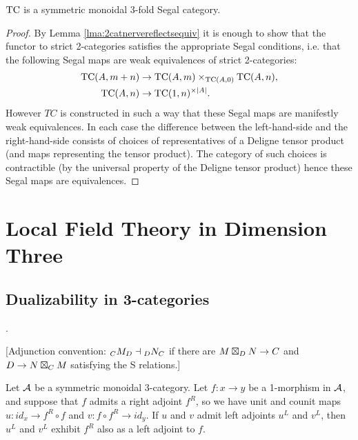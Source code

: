 \documentclass{amsart}
\begin{document}
\begin{theorem}
	 $\mathrm{TC}$ is a symmetric monoidal 3-fold Segal category.  
\end{theorem}

\begin{proof}
	By Lemma \ref{lma:2catnervereflectsequiv} it is enough to show that the functor to strict 2-categories satisfies the appropriate Segal conditions, i.e. that the following Segal maps are weak equivalences of strict 2-categories:
	\begin{align*}
		\mathrm{TC}(A, m + n) & \to \mathrm{TC}(A, m) \times_{\mathrm{TC}(A, 0)} \mathrm{TC}(A, n), \\
		\mathrm{TC}(A, n) & \to \mathrm{TC}(1, n)^{\times |A|}. 
	\end{align*}
However $TC$ is constructed in such a way that these Segal maps are manifestly weak equivalences. In each case the difference between the left-hand-side and the right-hand-side consists of choices of representatives of a Deligne tensor product (and maps representing the tensor product). The category of such choices is contractible (by the universal property of the Deligne tensor product) hence these Segal maps are equivalences. 
\end{proof}
 



\section{Local Field Theory in Dimension Three} \label{sec-lft}

\subsection{Dualizability in 3-categories} \label{sec-lft-dual}
.

[Adjunction convention: ${}_{C} {M}_{D} \dashv  {}_{D} {N}_{C}$ if there are $M \boxtimes_D N \rightarrow C$ and $D \rightarrow N \boxtimes_C M$ satisfying the S relations.] 




\begin{proposition} \label{prop-ambiadjoints}
	Let $\mathcal A$ be a symmetric monoidal 3-category. Let $f: x \to y$ be a 1-morphism in $\mathcal A$, and suppose that $f$ admits a right adjoint $f^R$,  so we have unit and counit maps $u:id_x \to f^R \circ f$ and $v:f \circ f^R \to id_y$. If $u$ and $v$ admit left adjoints $u^L$ and $v^L$, then $u^L$ and $v^L$ exhibit $f^R$ also as a left adjoint to $f$. 
\end{proposition}
\end{document}
